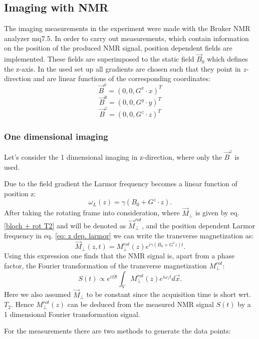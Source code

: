 \subsection{Imaging with NMR}
The imaging measurements in the experiment were made with the Bruker NMR analyzer mq7.5. 
In order to carry out measurements, which contain information on the position of the produced NMR signal, position dependent fields are implemented. These fields are superimposed to the static field $\vec{B}_0$ which defines the z-axis. In the used set up all gradients are chosen such that they point in $z$-direction and are linear functions of the corresponding coordinates:
$$\vec{B}^x = (0,0,G^x\cdot x)^T$$
$$\vec{B}^y = (0,0,G^y\cdot y)^T$$
$$\vec{B}^z = (0,0,G^z\cdot z)^T$$
\subsubsection{One dimensional imaging}
Let's consider the  1 dimensional imaging in z-direction, where only the $\vec{B}^z$ is used.  

Due to the field gradient the Larmor frequency becomes a linear function of position z:
\begin{equation}
\label{eq: z dep. larmor}
\omega_L(z) = \gamma(B_0 + G^z\cdot z).
\end{equation}
After taking the rotating frame into consideration, where $\vec{M}_\perp$ is given by eq. \ref{bloch + rot T2} and will be denoted as $\vec{M}_\perp^{rot}$, and the position dependent Larmor frequency in eq. \ref{eq: z dep. larmor} we can write the transverse magnetization as:
\begin{equation}
\vec{M}_\perp(z, t) = M_\perp^{rot}(z)e^{i\gamma(B_0 + G^{z}z)t}.
\end{equation}
Using this expression one finds that the NMR signal is, apart from a phase factor, the Fourier transformation of the transverse magnetization $M_\perp^{rot}$:
\begin{equation}
S(t)\propto e^{i\Omega t} \int_{V} M_\perp^{rot}(z) e^{i\omega_z t} d\vec{x}.
\end{equation}
Here we also assumed $\vec{M}_\perp$ to be constant since the acquisition time is short wrt. $T_2$. Hence $M_\perp^{rot}(z)$ can be deduced from the measured NMR signal $S(t)$ by a 1 dimensional Fourier transformation signal.

For the measurements there are two methods to generate the data points:
